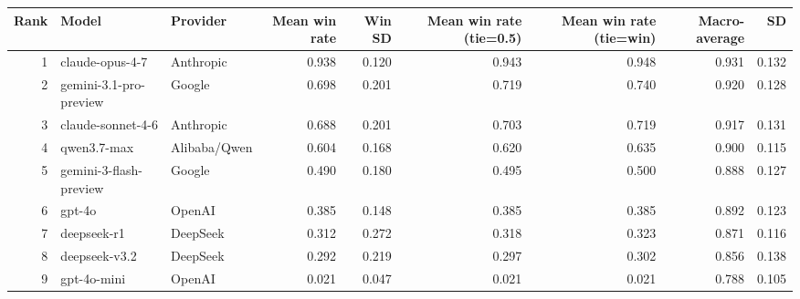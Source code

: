 \begin{tabular}{rllrrrrrr}
\toprule
Rank & Model & Provider & Mean win rate & Win SD & Mean win rate (tie=0.5) & Mean win rate (tie=win) & Macro-average & SD \\
\midrule
1 & claude-opus-4-7 & Anthropic & 0.938 & 0.120 & 0.943 & 0.948 & 0.931 & 0.132 \\
2 & gemini-3.1-pro-preview & Google & 0.698 & 0.201 & 0.719 & 0.740 & 0.920 & 0.128 \\
3 & claude-sonnet-4-6 & Anthropic & 0.688 & 0.201 & 0.703 & 0.719 & 0.917 & 0.131 \\
4 & qwen3.7-max & Alibaba/Qwen & 0.604 & 0.168 & 0.620 & 0.635 & 0.900 & 0.115 \\
5 & gemini-3-flash-preview & Google & 0.490 & 0.180 & 0.495 & 0.500 & 0.888 & 0.127 \\
6 & gpt-4o & OpenAI & 0.385 & 0.148 & 0.385 & 0.385 & 0.892 & 0.123 \\
7 & deepseek-r1 & DeepSeek & 0.312 & 0.272 & 0.318 & 0.323 & 0.871 & 0.116 \\
8 & deepseek-v3.2 & DeepSeek & 0.292 & 0.219 & 0.297 & 0.302 & 0.856 & 0.138 \\
9 & gpt-4o-mini & OpenAI & 0.021 & 0.047 & 0.021 & 0.021 & 0.788 & 0.105 \\
\bottomrule
\end{tabular}
